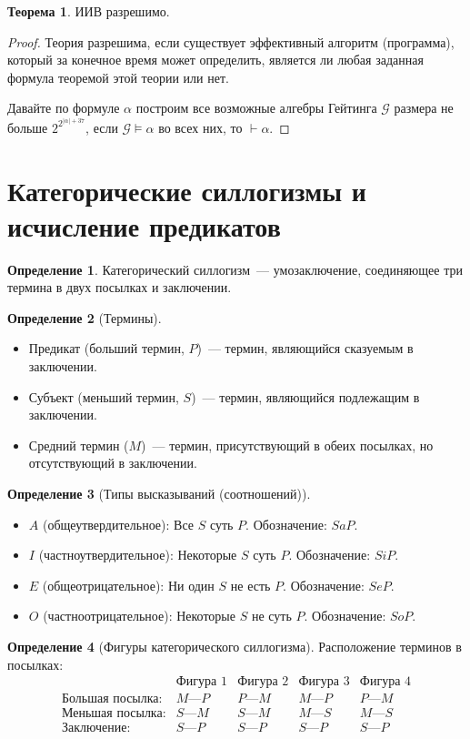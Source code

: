 \documentclass[a4paper,11pt]{article}
\theoremstyle{definition}
\newtheorem*{thm}{Теорема}
\newtheorem*{dfn}{Определение}
\newcommand{\proves}{\vdash}
\begin{document}
\begin{thm}
ИИВ разрешимо.
\end{thm}
\begin{proof}
Теория разрешима, если существует эффективный алгоритм (программа), который за
конечное время может определить, является ли любая заданная формула теоремой
этой теории или нет.

Давайте по формуле $\alpha$ построим все возможные алгебры Гейтинга $\mathcal{G}$
размера не больше $2^{2^{|\alpha|+37}}$, если $\mathcal{G} \models \alpha$ во
всех них, то $\proves \alpha$.
\end{proof}

\section{Категорические силлогизмы и исчисление предикатов}
\begin{dfn}
Категорический силлогизм~--- умозаключение, соединяющее три термина в двух
посылках и заключении.
\end{dfn}
\begin{dfn}[Термины]
\begin{itemize}
\item Предикат (больший термин, $P$)~--- термин, являющийся сказуемым в
  заключении.
\item Субъект (меньший термин, $S$)~--- термин, являющийся подлежащим в
  заключении.
\item Средний термин ($M$)~--- термин, присутствующий в обеих посылках, но
  отсутствующий в заключении.
\end{itemize}
\end{dfn}
\begin{dfn}[Типы высказываний (соотношений)]
\begin{itemize}
\item $A$ (общеутвердительное): Все $S$ суть $P$. Обозначение: $SaP$.
\item $I$ (частноутвердительное): Некоторые $S$ суть $P$. Обозначение: $SiP$.
\item $E$ (общеотрицательное): Ни один $S$ не есть $P$. Обозначение: $SeP$.
\item $O$ (частноотрицательное): Некоторые $S$ не суть $P$. Обозначение: $SoP$.
\end{itemize}
\end{dfn}
\begin{dfn}[Фигуры категорического силлогизма]
Расположение терминов в посылках:
\[
\begin{array}{l|c|c|c|c}
 & \text{Фигура 1} & \text{Фигура 2} & \text{Фигура 3} & \text{Фигура 4}\\\hline
\text{Большая посылка:} & M\text{---}P & P\text{---}M & M\text{---}P & P\text{---}M\\
\text{Меньшая посылка:} & S\text{---}M & S\text{---}M & M\text{---}S & M\text{---}S\\
\text{Заключение:} & S\text{---}P & S\text{---}P & S\text{---}P & S\text{---}P
\end{array}
\]
\end{dfn}
\end{document}
